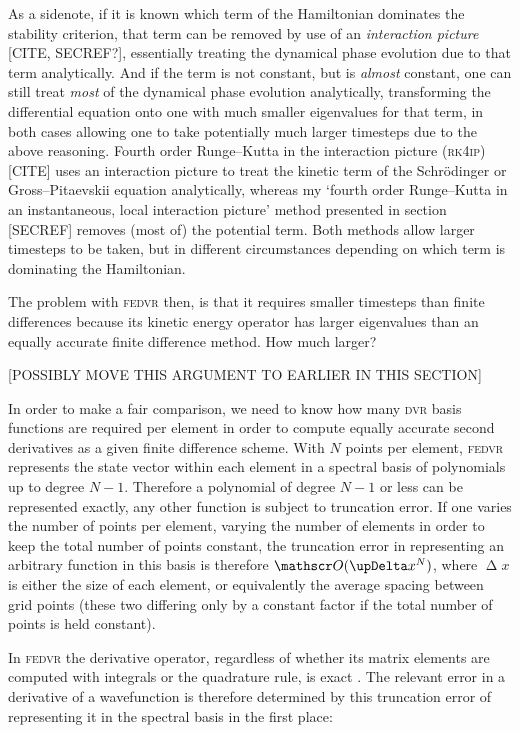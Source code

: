 As a sidenote, if it is known which term of the Hamiltonian dominates the stability criterion, that term can be removed by use of an \emph{interaction picture} [CITE, SECREF?], essentially treating the dynamical phase evolution due to that term analytically. And if the term is not constant, but is \emph{almost} constant, one can still treat \emph{most} of the dynamical phase evolution analytically, transforming the differential equation onto one with much smaller eigenvalues for that term, in both cases allowing one to take potentially much larger timesteps due to the above reasoning. Fourth order Runge--Kutta in the interaction picture (\textsc{rk4ip}) [CITE] uses an interaction picture to treat the kinetic term of the Schr\"odinger or Gross--Pitaevskii equation analytically, whereas my `fourth order Runge--Kutta in an instantaneous, local interaction picture' method presented in section [SECREF] removes (most of) the potential term. Both methods allow larger timesteps to be taken, but in different circumstances depending on which term is dominating the Hamiltonian.

The problem with \textsc{fedvr} then, is that it requires smaller timesteps than finite differences because its kinetic energy operator has larger eigenvalues than an equally accurate finite difference method. How much larger?

[POSSIBLY MOVE THIS ARGUMENT TO EARLIER IN THIS SECTION]

In order to make a fair comparison, we need to know how many \textsc{dvr} basis functions are required per element in order to compute equally accurate second derivatives as a given finite difference scheme. With $N$ points per element, \textsc{fedvr} represents the state vector within each element in a spectral basis of polynomials up to degree $N - 1$. Therefore a polynomial of degree $N - 1$ or less can be represented exactly, any other function is subject to truncation error. If one varies the number of points per element, varying the number of elements in order to keep the total number of points constant, the truncation error in representing an arbitrary function in this basis is therefore $\Ord{\upDelta x^N}$, where $\upDelta x$ is either the size of each element, or equivalently the average spacing between grid points (these two differing only by a constant factor if the total number of points is held constant).

In \textsc{fedvr} the derivative operator, regardless of whether its matrix elements are computed with integrals or the quadrature rule, is exact \cite{schneider_discrete_2005}. The relevant error in a derivative of a wavefunction is therefore determined by this truncation error of representing it in the spectral basis in the first place:

